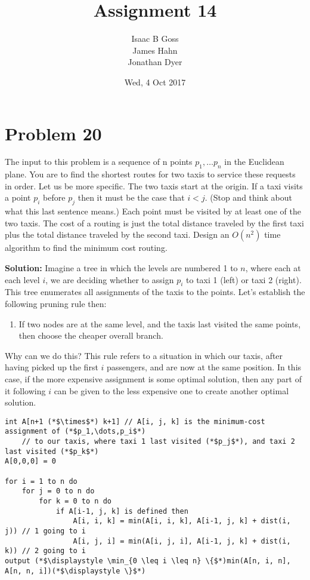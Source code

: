 \documentclass{article}
\author{Isaac B Goss\\ James Hahn\\ Jonathan Dyer}
\title{Assignment 14}
\date{Wed, 4 Oct 2017}
\providecommand{\prob}[1]{\section*{Problem #1}}
\providecommand{\soln}{\textbf{Solution: }}
\begin{document}
\maketitle
\prob{20}
The input to this problem is a sequence of n points $p_1, \dots p_n$ in the Euclidean plane. You are to find the shortest routes for two taxis to service these requests in order. Let us be more specific. The two taxis start at the origin. If a taxi visits a point $p_i$ before $p_j$ then it must be the case that $i < j$. (Stop and think about what this last sentence means.) Each point must be visited by at least one of the two taxis. The cost of a routing is just the total distance traveled by the first taxi plus the total distance traveled by the second taxi. Design an $O\left(n^2\right)$ time algorithm to find the minimum cost routing.

\soln Imagine a tree in which the levels are numbered 1 to $n$, where each at each level $i$, we are deciding whether to assign $p_i$ to taxi 1 (left) or taxi 2 (right).
This tree enumerates all assignments of the taxis to the points.
Let's establish the following pruning rule then:
\begin{enumerate}
    \item If two nodes are at the same level, and the taxis last visited the same points, then choose the cheaper overall branch.
\end{enumerate}

Why can we do this? This rule refers to a situation in which our taxis, after having picked up the first $i$ passengers, and are now at the same position.
In this case, if the more expensive assignment is some optimal solution, then any part of it following $i$ can be given to the less expensive one to create another optimal solution.

\begin{lstlisting}
int A[n+1 (*$\times$*) k+1] // A[i, j, k] is the minimum-cost assignment of (*$p_1,\dots,p_i$*)
    // to our taxis, where taxi 1 last visited (*$p_j$*), and taxi 2 last visited (*$p_k$*)
A[0,0,0] = 0

for i = 1 to n do 
    for j = 0 to n do
        for k = 0 to n do
            if A[i-1, j, k] is defined then
                A[i, i, k] = min(A[i, i, k], A[i-1, j, k] + dist(i, j)) // 1 going to i
                A[i, j, i] = min(A[i, j, i], A[i-1, j, k] + dist(i, k)) // 2 going to i
output (*$\displaystyle \min_{0 \leq i \leq n} \{$*)min(A[n, i, n], A[n, n, i])(*$\displaystyle \}$*)
\end{lstlisting}
\end{document}
